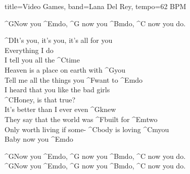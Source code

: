 \documentclass[titlepage]{article}
\begin{document}
\begin{song}{title=Video Games, band=Lana Del Rey, tempo=62 BPM}
	\begin{interlude}
		^{G}Now you ^{Em}do, ^G{} now you ^{Bm}do, ^{C}{} now you do.
	\end{interlude}

	\begin{chorus}
		^{D}It's you, it's you, it's all for you \\
		Everything I do \\
		I tell you all the ^{C}time \\
		Heaven is a place on earth with ^{G}you \\
		Tell me all the things you ^Fwant to ^{Em}do \\
		I heard that you like the bad girls \\
		^{C}Honey, is that true? \\
		It's better than I ever even ^{G}knew \\
		They say that the world was ^Fbuilt for ^{Em}two \\
		Only worth living if some- ^Cbody is loving ^{Cm}you \\
		Baby now you ^{Em}do
	\end{chorus}

	\begin{interlude}
		^{G}Now you ^{Em}do, ^G{} now you ^{Bm}do, ^{C}{} now you do. \\
		^{G}Now you ^{Em}do, ^G{} now you ^{Bm}do, ^{C}{} now you do.
	\end{interlude}
\end{song}
\pagebreak
\end{document}
